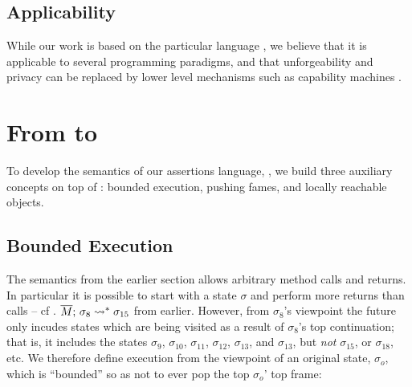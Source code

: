  
 

\subsection*{Applicability} 
While our work is based on the particular language  \LangOO , %
we believe that it is applicable to several programming paradigms, and  that   unforgeability and privacy
 can be replaced  by lower level mechanisms such as capability machines \cite{vanproving,davis2019cheriabi}.


\section{From \LangOO to \AssertLang}

{To develop the semantics of our assertions language, \AssertLang, we   build three auxiliary concepts on  top of  \LangOO: bounded execution, pushing fames, and locally  reachable objects.}


\subsection{Bounded Execution}
\label{sect:bounded}

{The semantics from the earlier section allows arbitrary method calls and returns. %
In particular it is possible to start with a state $\sigma$ and perform more returns than calls --
cf . $\overline{M};\, \sigma_{8} \leadsto^* {\sigma_{15}}$ from earlier.
 {However,  from $\sigma_8$'s viewpoint the future only incudes states which are being visited as a result of  $\sigma_8$'s top continuation}; that is, it includes the states $\sigma_9$, $\sigma_{10}$, $\sigma_{11}$, $\sigma_{12}$, $\sigma_{13}$, and $\sigma_{13}$, but \emph{not} $\sigma_{15}$, or $\sigma_{18}$, etc.
We therefore define  execution from the viewpoint of an original state, $\sigma_o$, which  is ``bounded'' so as not to ever pop the top  $\sigma_o$' top frame:}


